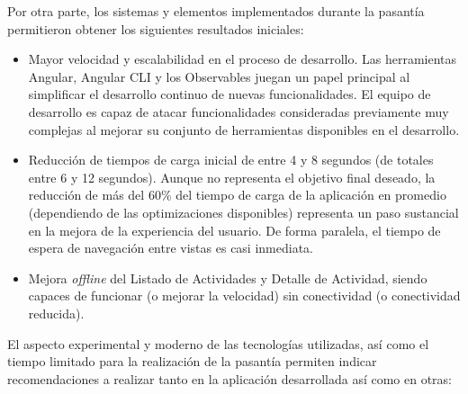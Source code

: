 Por otra parte, los sistemas y elementos implementados durante la pasantía permitieron obtener los siguientes resultados iniciales:

\begin{itemize}

  \item Mayor velocidad y escalabilidad en el proceso de desarrollo. Las herramientas Angular, Angular CLI y los Observables juegan un papel principal al simplificar el desarrollo continuo de nuevas funcionalidades. El equipo de desarrollo es capaz de atacar funcionalidades consideradas previamente muy complejas al mejorar su conjunto de herramientas disponibles en el desarrollo.

  \item Reducción de tiempos de carga inicial de entre 4 y 8 segundos (de totales entre 6 y 12 segundos). Aunque no representa el objetivo final deseado, la reducción de más del 60\% del tiempo de carga de la aplicación en promedio (dependiendo de las optimizaciones disponibles) representa un paso sustancial en la mejora de la experiencia del usuario. De forma paralela, el tiempo de espera de navegación entre vistas es casi inmediata.

  \item Mejora \textit{offline} del Listado de Actividades y Detalle de Actividad, siendo capaces de funcionar (o mejorar la velocidad) sin conectividad (o conectividad reducida).

\end{itemize}

El aspecto experimental y moderno de las tecnologías utilizadas, así como el tiempo limitado para la realización de la pasantía permiten indicar recomendaciones a realizar tanto en la aplicación desarrollada así como en otras:

